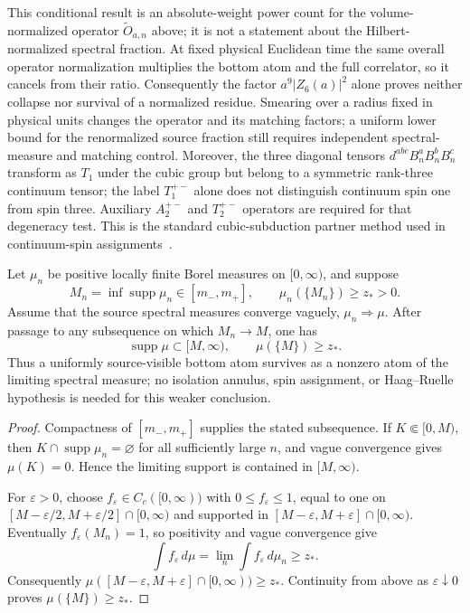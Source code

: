 This conditional result is an absolute-weight power count for the
volume-normalized operator $\widetilde O_{a,n}$ above; it is not a
statement about the Hilbert-normalized spectral fraction.  At fixed physical
Euclidean time the same overall operator normalization multiplies the bottom
atom and the full correlator, so it cancels from their ratio.  Consequently
the factor $a^9|Z_6(a)|^2$ alone proves neither collapse nor survival of a
normalized residue.  Smearing over a radius fixed in physical units changes
the operator and its matching factors; a uniform lower bound for the
renormalized source fraction still requires independent spectral-measure and
matching control.  Moreover, the three diagonal tensors
$d^{abc}B_n^aB_n^bB_n^c$ transform as $T_1$ under the cubic group but belong
to a symmetric rank-three continuum tensor; the label $T_1^{+-}$ alone does
not distinguish continuum spin one from spin three.  Auxiliary
$A_2^{+-}$ and $T_2^{+-}$ operators are required for that degeneracy test.
This is the standard cubic-subduction partner method used in continuum-spin
assignments~\cite{MorningstarPeardon1999,AthenodorouTeper2020}.

\begin{proposition}
\label{prop:g19-atom-passage}
Let $\mu_n$ be positive locally finite Borel measures on $[0,\infty)$,
and suppose
\[
 M_n=\inf\operatorname{supp}\mu_n\in[m_-,m_+],
 \qquad \mu_n(\{M_n\})\ge z_*>0 .
\]
Assume that the source spectral measures converge vaguely,
$\mu_n\Rightarrow\mu$.  After passage to any subsequence on which
$M_n\to M$, one has
\begin{equation}
 \operatorname{supp}\mu\subset[M,\infty),
 \qquad \mu(\{M\})\ge z_* .
 \label{eq:g19-atom-passage}
\end{equation}
Thus a uniformly source-visible bottom atom survives as a nonzero atom of
the limiting spectral measure; no isolation annulus, spin assignment, or
Haag--Ruelle hypothesis is needed for this weaker conclusion.
\end{proposition}

\begin{proof}
Compactness of $[m_-,m_+]$ supplies the stated subsequence.  If
$K\Subset[0,M)$, then $K\cap\operatorname{supp}\mu_n=\varnothing$ for all
sufficiently large $n$, and vague convergence gives $\mu(K)=0$.  Hence the
limiting support is contained in $[M,\infty)$.

For $\varepsilon>0$, choose $f_\varepsilon\in C_c([0,\infty))$ with
$0\le f_\varepsilon\le1$, equal to one on
$[M-\varepsilon/2,M+\varepsilon/2]\cap[0,\infty)$ and supported in
$[M-\varepsilon,M+\varepsilon]\cap[0,\infty)$.  Eventually
$f_\varepsilon(M_n)=1$, so positivity and vague convergence give
\[
 \int f_\varepsilon\,d\mu
 =\lim_n\int f_\varepsilon\,d\mu_n\ge z_* .
\]
Consequently
$\mu([M-\varepsilon,M+\varepsilon]\cap[0,\infty))\ge z_*$.  Continuity
from above as $\varepsilon\downarrow0$ proves
$\mu(\{M\})\ge z_*$.
\end{proof}

